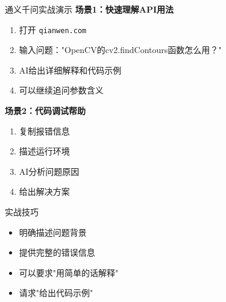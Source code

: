 \begin{frame}{通义千问实战演示}
	\textbf{场景1：快速理解API用法}
	\begin{enumerate}
		\item 打开 \texttt{qianwen.com}
		\item 输入问题："OpenCV的cv2.findContours函数怎么用？"
		\item AI给出详细解释和代码示例
		\item 可以继续追问参数含义
	\end{enumerate}

	\vspace{0.3cm}

	\textbf{场景2：代码调试帮助}
	\begin{enumerate}
		\item 复制报错信息
		\item 描述运行环境
		\item AI分析问题原因
		\item 给出解决方案
	\end{enumerate}

	\vspace{0.3cm}

	\begin{exampleblock}{实战技巧}
		\begin{itemize}
			\item 明确描述问题背景
			\item 提供完整的错误信息
			\item 可以要求"用简单的话解释"
			\item 请求"给出代码示例"
		\end{itemize}
	\end{exampleblock}
\end{frame}



